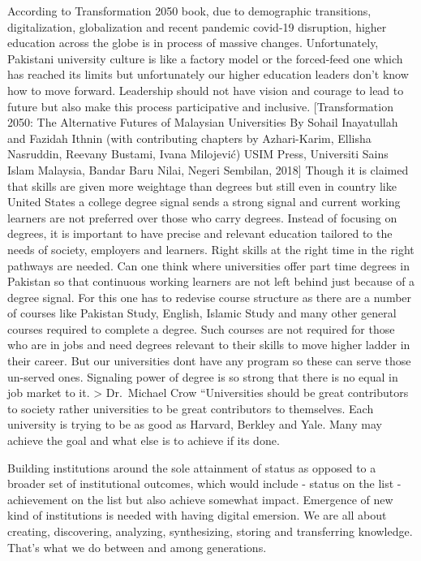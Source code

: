 \documentclass[]{elsarticle} %
\begin{document}
According to Transformation 2050 book, due to demographic transitions,
digitalization, globalization and recent pandemic covid-19 disruption,
higher education across the globe is in process of massive changes.
Unfortunately, Pakistani university culture is like a factory model or
the forced-feed one which has reached its limits but unfortunately our
higher education leaders don't know how to move forward. Leadership
should not have vision and courage to lead to future but also make this
process participative and inclusive. {[}Transformation 2050: The
Alternative Futures of Malaysian Universities By Sohail Inayatullah and
Fazidah Ithnin (with contributing chapters by Azhari-Karim, Ellisha
Nasruddin, Reevany Bustami, Ivana Milojević) USIM Press, Universiti
Sains Islam Malaysia, Bandar Baru Nilai, Negeri Sembilan, 2018{]} Though
it is claimed that skills are given more weightage than degrees but
still even in country like United States a college degree signal sends a
strong signal and current working learners are not preferred over those
who carry degrees. Instead of focusing on degrees, it is important to
have precise and relevant education tailored to the needs of society,
employers and learners. Right skills at the right time in the right
pathways are needed. Can one think where universities offer part time
degrees in Pakistan so that continuous working learners are not left
behind just because of a degree signal. For this one has to redevise
course structure as there are a number of courses like Pakistan Study,
English, Islamic Study and many other general courses required to
complete a degree. Such courses are not required for those who are in
jobs and need degrees relevant to their skills to move higher ladder in
their career. But our universities dont have any program so these can
serve those un-served ones. Signaling power of degree is so strong that
there is no equal in job market to it. \textgreater{} Dr.~Michael Crow
``Universities should be great contributors to society rather
universities to be great contributors to themselves. Each university is
trying to be as good as Harvard, Berkley and Yale. Many may achieve the
goal and what else is to achieve if its done.

Building institutions around the sole attainment of status as opposed to
a broader set of institutional outcomes, which would include - status on
the list - achievement on the list but also achieve somewhat impact.
Emergence of new kind of institutions is needed with having digital
emersion. We are all about creating, discovering, analyzing,
synthesizing, storing and transferring knowledge. That's what we do
between and among generations.
\end{document}
